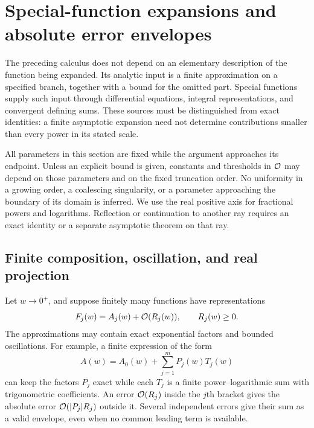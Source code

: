 \section{Special-function expansions and absolute error envelopes}
\label{sec:special-function-expansions}

The preceding calculus does not depend on an elementary description of
the function being expanded. Its analytic input is a finite approximation
on a specified branch, together with a bound for the omitted part.
Special functions supply such input through differential equations,
integral representations, and convergent defining sums. These sources
must be distinguished from exact identities: a finite asymptotic
expansion need not determine contributions smaller than every power in
its stated scale.

All parameters in this section are fixed while the argument approaches
its endpoint. Unless an explicit bound is given, constants and
thresholds in $\mathcal O$ may depend on those parameters and on the fixed
truncation order. No uniformity in a growing order, a coalescing
singularity, or a parameter approaching the boundary of its domain is
inferred. We use the real positive axis for fractional powers and
logarithms. Reflection or continuation to another ray requires an exact
identity or a separate asymptotic theorem on that ray.

\subsection{Finite composition, oscillation, and real projection}

Let $w\to0^+$, and suppose finitely many functions have representations
\begin{equation}
 F_j(w)=A_j(w)+\mathcal O(R_j(w)),\qquad R_j(w)\ge0.
 \label{eq:special-function-input-envelope}
\end{equation}
The approximations may contain exact exponential factors and bounded
oscillations. For example, a finite expression of the form
\begin{equation}
 A(w)=A_0(w)+\sum_{j=1}^m P_j(w)T_j(w)
 \label{eq:special-function-finite-carriers}
\end{equation}
can keep the factors $P_j$ exact while each $T_j$ is a finite
power--logarithmic sum with trigonometric coefficients. An error
$\mathcal O(R_j)$ inside the $j$th bracket gives the absolute error
$\mathcal O(|P_j|R_j)$ outside it. Several independent errors give their sum
as a valid envelope, even when no common leading term is available.

